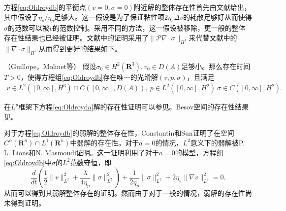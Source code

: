 方程\eqref{eq:Oldroydb}的平衡点$(v=0,\sigma=0)$附近解的整体存在性首先由文献\cite{guillope1990existence}给出，其中假设了$\eta_s/\eta_p$足够大。这一假设是为了保证粘性项$ 2 \eta_s \Delta v$的耗散足够好从而使得$\sigma$的范数可以被$v$的范数控制。采用不同的方法，这一假设被移除，更一般的整体存在性结果也已经被证明\cite{chupin2004some,molinet2004global,molinet2004existence}。文献\cite{molinet2004global,molinet2004existence}中的证明采用了$\|\mathcal{P}\nabla \cdot \sigma\|_{H^1}$来代替文献\cite{guillope1990existence}中的$\|\nabla \cdot \sigma\|_{H^1}$从而得到更好的结果如下。
\begin{theorem}（Guillope，Molinet等\cite{guillope1990existence,molinet2004existence}）
	假设$\sigma_0 \in H^2(\mathbf{R}^3),v_0 \in D(A)$足够小。那么存在时间$T>0$，使得方程组\eqref{eq:Oldroydb}存在唯一的光滑解$(v,p,\sigma)$，且满足
	\begin{eqnarray*}
		v \in L^2([0,\infty],H^3) \cap C([0,\infty],D(A)), \ p \in L^2([0,\infty],H^2) \ \sigma \in C([0,\infty],H^2).
	\end{eqnarray*}
\end{theorem}
在$L^p$框架下方程\eqref{eq:Oldroyda}解的存在性证明可以参见\cite{fernandez1998some,zhang2012global}。Besov空间的存在性结果见\cite{chemin2001lifespan}。

对于方程\eqref{eq:Oldroydb}的弱解的整体存在性，Constantin和Sun证明了在空间$C^\alpha(\mathbf{R}^n) \cap L^1(\mathbf{R}^n)$中弱解的存在性\cite{constantin2010remarks,saut2012lectures}。对于$a=0$的情况，$L^2$意义下的弱解被P. L. Lions和N. Masmoudi证明\cite{lions2000global}。这一证明利用了对于$a=0$的模型，方程组\eqref{eq:Oldroydb}中$\sigma$的$L^2$范数守恒，即
\begin{equation*}
	\frac{d}{dt} \left(\frac{1}{2} \|v\|_{L^2}^2 +  \frac{\lambda}{4 \eta_p} \|\sigma\|_{L^2}^2 \right) + \frac{1}{2\eta_p} \|\sigma\|_{L^2}^2 + {2 \eta_s} \|\nabla v\|_{L^2}^2 = 0.
\end{equation*}
从而可以得到其弱解整体存在的证明。然而由于对于一般的情况，弱解的存在性尚未得到证明\cite{saut2012lectures}。

